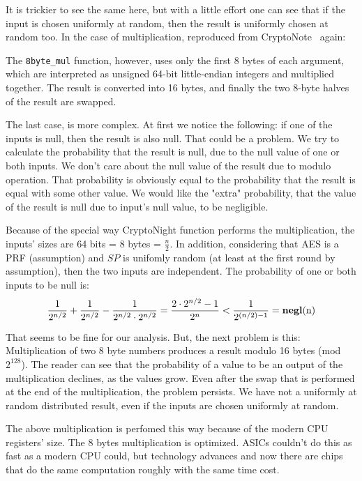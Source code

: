 It is trickier to see the same here, but with a little effort one can see that if the input is chosen uniformly at random, then the result is uniformly chosen at random too. In the case of multiplication, reproduced from CryptoNote~\cite{cryptonight} again:
\begin{quoting}
   The \verb|8byte_mul| function, however, uses only the first 8 bytes
   of each argument, which are interpreted as unsigned 64-bit
   little-endian integers and multiplied together. The result is
   converted into 16 bytes, and finally the two 8-byte halves of
   the result are swapped.
\end{quoting}

The last case, is more complex. At first we notice the following: if one of the inputs is null, then the result is also null. That could be a problem. We try to calculate the probability that the result is null, due to the null value of one or both inputs. We don't care about the null value of the result due to modulo operation. That probability is obviously equal to the probability that the result is equal with some other value. We would like the "extra" probability, that the value of the result is null due to input's null value, to be negligible.

Because of the special way CryptoNight function performs the multiplication, the inputs' sizes are 64 bits = 8 bytes = $\frac{n}{2}$. In addition, considering that AES is a PRF (assumption) and $SP$ is unifomly random (at least at the first round by assumption), then the two inputs are independent. The probability of one or both inputs to be null is:
\begin{equation} \label{prob_zero}
  \frac{1}{2^{n/2}} + \frac{1}{2^{n/2}} - \frac{1}{2^{n/2} \cdot 2^{n/2}} = \frac{2\cdot2^{n/2}-1}{2^n} < \frac{1}{2^{(n/2)-1}} = \mbox{\textbf{negl}(n)}
\end{equation}
\vspace{0.3cm}

That seems to be fine for our analysis. But, the next problem is this: Multiplication of two 8 byte numbers produces a result modulo 16 bytes (mod $2^{128}$). The reader can see that the probability of a value to be an output of the multiplication declines, as the values grow. Even after the swap that is performed at the end of the multiplication, the problem persists. We have not a uniformly at random distributed result, even if the inputs are chosen uniformly at random.

The above multiplication is perfomed this way because of the modern CPU registers' size. The 8 bytes multiplication is optimized. ASICs couldn't do this as fast as a modern CPU could, but technology advances and now there are chips that do the same computation roughly with the same time cost.

